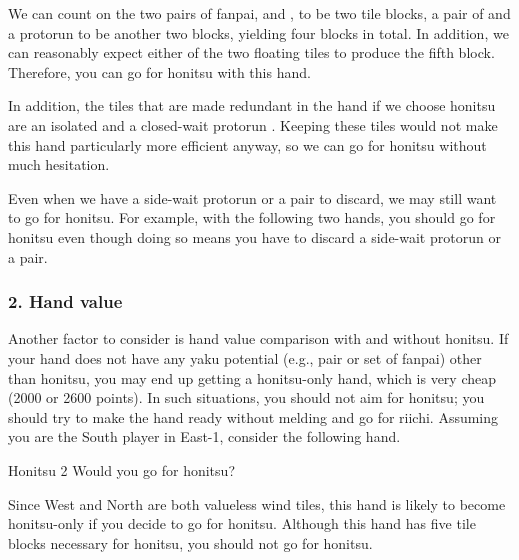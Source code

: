 \bigskip
We can count on the two pairs of {\jap fanpai}, {\LARGE\dong\dong} and {\LARGE\zhong\zhong}, to be two tile blocks, a pair of {\LARGE{}} and a protorun {\LARGE{}} to be another two blocks, yielding four blocks in total. In addition, we can reasonably expect either of the two floating tiles {\LARGE\xi}{\LARGE{}} to produce the fifth block. Therefore, you can go for {\jap honitsu} with this hand. 

\bigskip
In addition, the tiles that are made redundant in the hand if we choose {\jap honitsu} are an isolated {\LARGE{}} and a closed-wait protorun {\LARGE{}}. Keeping these tiles would not make this hand particularly more efficient anyway, so we can go for {\jap honitsu} without much hesitation. 

\bigskip
Even when we have a side-wait protorun or a pair to discard, we may still want to go for {\jap honitsu}. For example, with the following two hands, you should go for {\jap honitsu} even though doing so means you have to discard a side-wait protorun or a pair. 
\bp
{}\xi\bai\bai\bai\\
\dong\nan\nan\bei\zhong
\ep

\bigskip
\subsubsection{2. Hand value}

Another factor to consider is hand value comparison with and without {\jap honitsu}. If your hand does not have any {\jap yaku} potential (e.g., pair or set of {\jap fanpai}) other than {\jap honitsu}, you may end up getting a {\jap honitsu}-only hand, which is very cheap (2000 or 2600 points). In such situations, you should not aim for {\jap honitsu}; you should try to make the hand ready without melding and go for riichi. Assuming you are the South player in East-1, consider the following hand.
\bigskip
\begin{itembox}[r]{{\jap Honitsu} 2}
\bp
{}\xi\xi\bei\bei
\ep
\vspace{-10pt}Would you go for {\jap honitsu}? \vspace{-5pt}
\end{itembox}

\bigskip
Since West and North are both valueless wind tiles, this hand is likely to become {\jap honitsu}-only if you decide to go for {\jap honitsu}. Although this hand has five tile blocks necessary for {\jap honitsu}, you should not go for {\jap honitsu}. 

